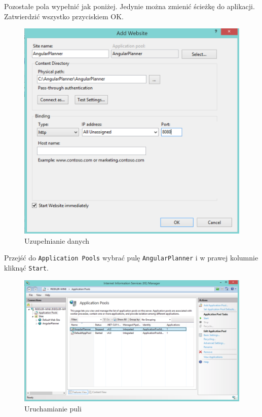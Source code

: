 \documentclass[10pt,titlepage]{article}
\begin{document}
\par Pozostałe pola wypełnić jak poniżej. Jedynie można zmienić ścieżkę do aplikacji. Zatwierdzić wszystko przyciskiem OK.
\begin{figure}[H]
  \centering
  \includegraphics[scale=0.35]{images/install10.png}
  \caption{Uzupełnianie danych}
\end{figure}
\par Przejść do \verb|Application Pools| wybrać pulę \verb|AngularPlanner| i w prawej kolumnie kliknąć \verb|Start|.
\begin{figure}[H]
  \centering
  \includegraphics[scale=0.35]{images/install11.png}
  \caption{Uruchamianie puli}
\end{figure}




\end{document}

